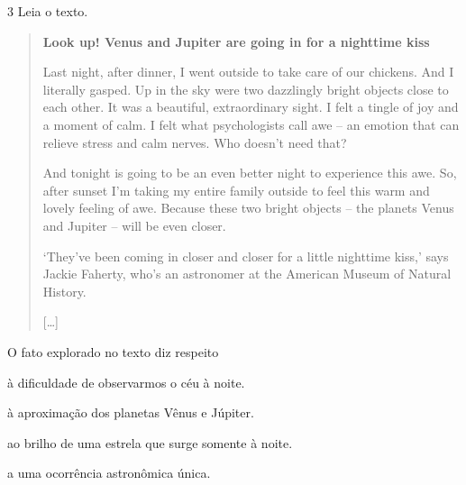 
\num{3} Leia o texto.

\begin{quote}
\textbf{Look up! Venus and Jupiter are going in for a nighttime kiss}

Last night, after dinner, I went outside to take care of our chickens.
And I literally gasped. Up in the sky were two dazzlingly bright objects
close to each other. It was a beautiful, extraordinary sight. I felt a
tingle of joy and a moment of calm. I felt what psychologists call awe
-- an emotion that can relieve stress and calm nerves. Who doesn't need
that?

And tonight is going to be an even better night to experience this awe.
So, after sunset I'm taking my entire family outside to feel this warm
and lovely feeling of awe. Because these two bright objects -- the
planets Venus and Jupiter -- will be even closer.

`They've been coming in closer and closer for a little nighttime kiss,'
says Jackie Faherty, who's an astronomer at the American Museum of
Natural History.

{[}\ldots{}{]}

\end{quote}

O fato explorado no texto diz respeito

\begin{escolha}
\item à dificuldade de observarmos o céu à noite.

\item à aproximação dos planetas Vênus e Júpiter.

\item ao brilho de uma estrela que surge somente à noite.

\item a uma ocorrência astronômica única.
\end{escolha}

